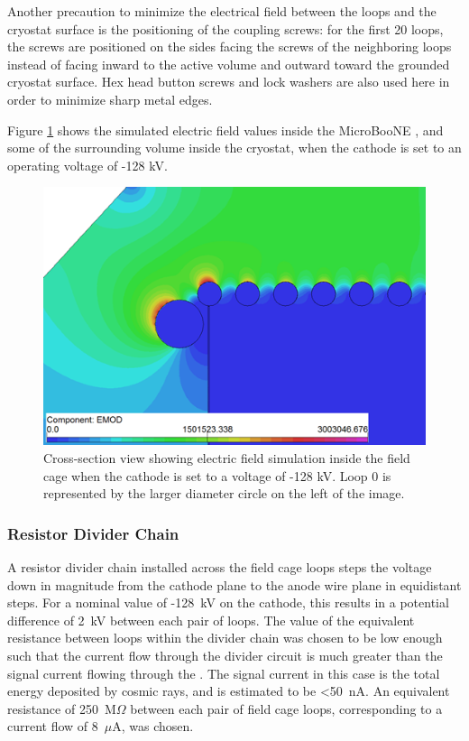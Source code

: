 Another precaution to minimize the electrical field between the loops and the cryostat surface is the positioning of the coupling screws: for the first 20 loops, the screws are positioned on the sides facing the screws of the neighboring loops instead of facing inward to the \lartpc active volume and outward toward the grounded cryostat surface. Hex head button screws and lock washers are also used here in order to minimize sharp metal edges.

Figure \ref{fig:efield} shows the simulated electric field values inside the MicroBooNE \lartpc, and some of the surrounding volume inside the cryostat, when the cathode is set to an operating voltage of -128 kV.  

\begin{figure}[htb]
\centering	
\includegraphics[width=0.7\linewidth]{figures/efield.png}
\caption{Cross-section view showing electric field simulation inside the field cage when the cathode is set to a voltage of -128 kV.  Loop 0 is represented by the larger diameter circle on the left of the image.}
\label{fig:efield}
\end{figure}



\subsubsection{Resistor Divider Chain}

A resistor divider chain installed across the field cage loops steps the voltage down in magnitude from the cathode plane to the anode wire plane in equidistant steps.  For a nominal value of -128~kV on the cathode, this results in a potential difference of 2~kV between each pair of loops. The value of the equivalent resistance between loops within the divider chain was chosen to be low enough such that the current flow through the divider circuit is much greater than the signal current flowing through the \lartpc. The signal current in this case is the total energy deposited by cosmic rays, and is estimated to be <50~nA. An equivalent resistance of 250~M$\Omega$ between each pair of field cage loops, corresponding to a current flow of 8~$\mu$A, was chosen.  

